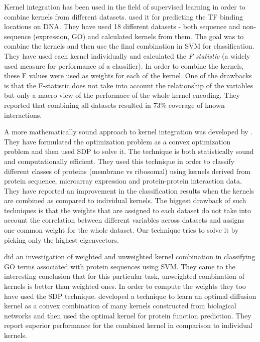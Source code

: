 Kernel integration has been used in the field of supervised learning in order to combine kernels from different datasets. \citet{Holloway2006MachineLearning} used it for predicting the TF binding locations on DNA. They have used 18 different datasets - both sequence and non-sequence (expression, GO) and calculated kernels from them. The goal was to combine the kernels and then use the final combination in \ac{SVM} for classification. They have used each kernel individually and calculated the \textit{F statistic} (a widely used measure for performance of a classifier). In order to combine the kernels, these F values were used as weights for each of the kernel. One of the drawbacks is that the F-statistic does not take into account the relationship of the variables but only a macro view of the performace of the whole kernel encoding. They reported that combining all datasets resulted in 73\% coverage of known interactions. 

A more mathematically sound approach to kernel integration was developed by \citet{lanck04kerneldatafusion}. They have formulated the optimization problem as a convex optimization problem and then used \ac{SDP} to solve it. The technique is both statistically sound and computationally efficient. They used this technique in order to classify different classes of proteins (membrane vs ribosomal) using kernels derived from protein sequence, microarray expression and protein-protein interaction data. They have reported an improvement in the classification results when the kernels are combined as compared to individual kernels. The biggest drawback of such techniques is that the weights that are assigned to each dataset do not take into account the correlation between different variables across datasets and assigns one common weight for the whole dataset. Our technique tries to solve it by picking only the highest eigenvectors.

\citet{lewis06svm} did an investigation of weighted and unweighted kernel combination in classifying GO terms associated with protein sequences using SVM. They came to the interesting conclusion that for this particular task, unweighted combination of kernels is better than weighted ones. In order to compute the weights they too have used the SDP technique. \citet{Liang2008Adaptive} developed a technique to learn an optimal diffusion kernel as a convex combination of many kernels constructed from biological networks and then used the optimal kernel for protein function prediction. They report superior performance for the combined kernel in comparison to individual kernels. 

